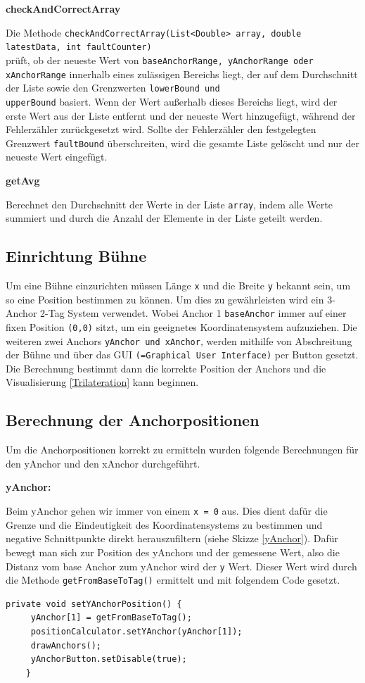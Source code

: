 \textbf{checkAndCorrectArray}

Die Methode \texttt{checkAndCorrectArray(List<Double> array, double latestData, int faultCounter)} \\ prüft, ob der neueste Wert von \texttt{baseAnchorRange, yAnchorRange oder xAnchorRange} innerhalb eines zulässigen Bereichs liegt, der auf dem Durchschnitt der Liste sowie den Grenzwerten \texttt{lowerBound und \\ upperBound} basiert. Wenn der Wert außerhalb dieses Bereichs liegt, wird der erste Wert aus der Liste entfernt und der neueste Wert hinzugefügt, während der Fehlerzähler zurückgesetzt wird. Sollte der Fehlerzähler den festgelegten Grenzwert \texttt{faultBound} überschreiten, wird die gesamte Liste gelöscht und nur der neueste Wert eingefügt.

\textbf{getAvg}

Berechnet den Durchschnitt der Werte in der Liste \texttt{array}, indem alle Werte summiert und durch die Anzahl der Elemente in der Liste geteilt werden.

\subsection{Einrichtung Bühne}
\label{Einrichtung Bühne}
Um eine Bühne einzurichten müssen Länge \texttt{x} und die Breite \texttt{y} bekannt sein, um so eine Position bestimmen zu können. Um dies zu gewährleisten wird ein 3-Anchor 2-Tag System verwendet. Wobei Anchor 1 \texttt{baseAnchor} immer auf einer fixen Position \texttt{(0,0)} sitzt, um ein geeignetes Koordinatensystem aufzuziehen. Die weiteren zwei Anchors \texttt{yAnchor und xAnchor}, werden mithilfe von Abschreitung der Bühne und über das GUI \texttt{(=Graphical User Interface)} per Button gesetzt. Die Berechnung bestimmt dann die korrekte Position der Anchors und die Visualisierung \ref{Trilateration} kann beginnen. 
\newpage
\subsection{Berechnung der Anchorpositionen}
Um die Anchorpositionen korrekt zu ermitteln wurden folgende Berechnungen für den yAnchor und den xAnchor durchgeführt.

\textbf{yAnchor:}

Beim yAnchor gehen wir immer von einem \texttt{x = 0} aus. Dies dient dafür die Grenze und die Eindeutigkeit des Koordinatensystems zu bestimmen und negative Schnittpunkte direkt herauszufiltern (siehe Skizze \ref{yAnchor}). Dafür bewegt man sich zur Position des yAnchors und der gemessene Wert, also die Distanz vom base Anchor zum yAnchor wird der \texttt{y} Wert. Dieser Wert wird durch die Methode \texttt{getFromBaseToTag()} ermittelt und mit folgendem Code gesetzt.
\begin{lstlisting}[style=Java, caption=Berechnung yAnchor, captionpos=b]
	private void setYAnchorPosition() {
     yAnchor[1] = getFromBaseToTag();
     positionCalculator.setYAnchor(yAnchor[1]);
     drawAnchors();
     yAnchorButton.setDisable(true);
    }
\end{lstlisting}


